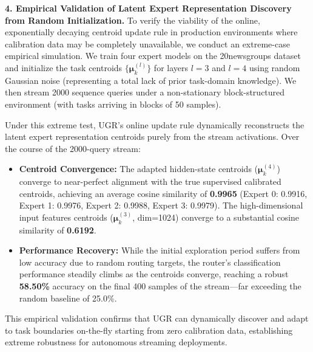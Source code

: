 \documentclass{article}
\theoremstyle{plain}
\theoremstyle{definition}
\theoremstyle{remark}
\begin{document}
\textbf{4. Empirical Validation of Latent Expert Representation Discovery from Random Initialization.}
To verify the viability of the online, exponentially decaying centroid update rule in production environments where calibration data may be completely unavailable, we conduct an extreme-case empirical simulation. We train four expert models on the 20newsgroups dataset and initialize the task centroids $\{\boldsymbol{\mu}_k^{(l)}\}$ for layers $l=3$ and $l=4$ using random Gaussian noise (representing a total lack of prior task-domain knowledge). We then stream 2000 sequence queries under a non-stationary block-structured environment (with tasks arriving in blocks of 50 samples).

Under this extreme test, UGR's online update rule dynamically reconstructs the latent expert representation centroids purely from the stream activations. Over the course of the 2000-query stream:
\begin{itemize}
    \item \textbf{Centroid Convergence:} The adapted hidden-state centroids ($\boldsymbol{\mu}_k^{(4)}$) converge to near-perfect alignment with the true supervised calibrated centroids, achieving an average cosine similarity of \textbf{0.9965} (Expert 0: 0.9916, Expert 1: 0.9976, Expert 2: 0.9988, Expert 3: 0.9979). The high-dimensional input features centroids ($\boldsymbol{\mu}_k^{(3)}$, dim=1024) converge to a substantial cosine similarity of \textbf{0.6192}.
    \item \textbf{Performance Recovery:} While the initial exploration period suffers from low accuracy due to random routing targets, the router's classification performance steadily climbs as the centroids converge, reaching a robust \textbf{58.50\%} accuracy on the final 400 samples of the stream—far exceeding the random baseline of 25.0\%.
\end{itemize} This empirical validation confirms that UGR can dynamically discover and adapt to task boundaries on-the-fly starting from zero calibration data, establishing extreme robustness for autonomous streaming deployments.

\end{document}
